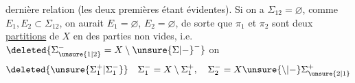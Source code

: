   dernière relation (les deux premières étant évidentes).
Si on a $\Sigma_{12}=\varnothing$, comme $E_1,E_2\subset\Sigma_{12}$, on aurait $E_1=\varnothing$, $E_2=\varnothing$, de sorte que $\pi_1$ et $\pi_2$ sont deux \uline{partitions} de $X$ en des parties non vides, i.e. $\deleted{\Sigma_{\unsure{1|2}}^- = X\setminus{\unsure{\Sigma|{-}}}^-}$ on 
\[
\deleted{\unsure{\Sigma_1^+|\Sigma_1^-}}\quad\Sigma_1^-=X\setminus\Sigma_1^+,\quad\Sigma_2^-=X\unsure{\setminus|-}\Sigma_{\unsure{2|1}}^+
\]
\endgroup
